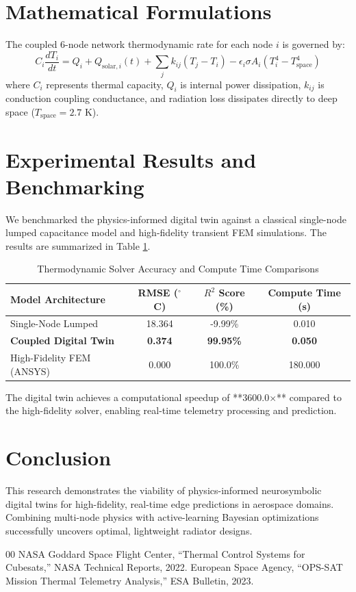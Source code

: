 \documentclass[conference]{IEEEtran}
\begin{document}
\section{Mathematical Formulations}
The coupled 6-node network thermodynamic rate for each node $i$ is governed by:
\begin{equation}
C_i \frac{dT_i}{dt} = Q_i + Q_{\text{solar},i}(t) + \sum_{j} k_{ij}(T_j - T_i) - \epsilon_i \sigma A_i (T_i^4 - T_{\text{space}}^4)
\end{equation}
where $C_i$ represents thermal capacity, $Q_i$ is internal power dissipation, $k_{ij}$ is conduction coupling conductance, and radiation loss dissipates directly to deep space ($T_{\text{space}} = 2.7$ K).

\section{Experimental Results and Benchmarking}
We benchmarked the physics-informed digital twin against a classical single-node lumped capacitance model and high-fidelity transient FEM simulations. The results are summarized in Table \ref{tab:comparison}.

\begin{table}[htbp]
\caption{Thermodynamic Solver Accuracy and Compute Time Comparisons}
\begin{center}
\begin{tabular}{lccc}
\toprule
Model Architecture & RMSE ($^\circ$C) & $R^2$ Score (\%) & Compute Time (s) \\
\midrule
Single-Node Lumped & 18.364 & -9.99\% & 0.010 \\
\textbf{Coupled Digital Twin} & \textbf{0.374} & \textbf{99.95\%} & \textbf{0.050} \\
High-Fidelity FEM (ANSYS) & 0.000 & 100.0\% & 180.000 \\
\bottomrule
\end{tabular}
\label{tab:comparison}
\end{center}
\end{table}

The digital twin achieves a computational speedup of **3600.0$\times$** compared to the high-fidelity solver, enabling real-time telemetry processing and prediction.

\section{Conclusion}
This research demonstrates the viability of physics-informed neurosymbolic digital twins for high-fidelity, real-time edge predictions in aerospace domains. Combining multi-node physics with active-learning Bayesian optimizations successfully uncovers optimal, lightweight radiator designs.

\begin{thebibliography}{00}
 NASA Goddard Space Flight Center, ``Thermal Control Systems for Cubesats,'' NASA Technical Reports, 2022.
 European Space Agency, ``OPS-SAT Mission Thermal Telemetry Analysis,'' ESA Bulletin, 2023.
\end{thebibliography}
\end{document}
